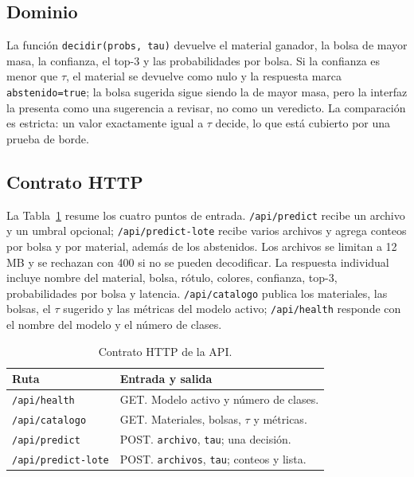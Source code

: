\documentclass[10pt]{ieeeconf}
\begin{document}
\subsection{Dominio}

La funci\'on \texttt{decidir(probs, tau)} devuelve el material ganador, la bolsa
de mayor masa, la confianza, el top-3 y las probabilidades por bolsa. Si la
confianza es menor que $\tau$, el material se devuelve como nulo y la respuesta
marca \texttt{abstenido=true}; la bolsa sugerida sigue siendo la de mayor masa,
pero la interfaz la presenta como una sugerencia a revisar, no como un veredicto.
La comparaci\'on es estricta: un valor exactamente igual a $\tau$ decide, lo que
est\'a cubierto por una prueba de borde.

\subsection{Contrato HTTP}

La Tabla~\ref{tab:api} resume los cuatro puntos de entrada. \texttt{/api/predict}
recibe un archivo y un umbral opcional; \texttt{/api/predict-lote} recibe varios
archivos y agrega conteos por bolsa y por material, adem\'as de los abstenidos.
Los archivos se limitan a 12 MB y se rechazan con 400 si no se pueden decodificar.
La respuesta individual incluye nombre del material, bolsa, r\'otulo, colores,
confianza, top-3, probabilidades por bolsa y latencia. \texttt{/api/catalogo}
publica los materiales, las bolsas, el $\tau$ sugerido y las m\'etricas del modelo
activo; \texttt{/api/health} responde con el nombre del modelo y el n\'umero de
clases.

\begin{table}[t]
\centering
\caption{Contrato HTTP de la API.}
\label{tab:api}
\scriptsize
\setlength{\tabcolsep}{3pt}
\begin{tabular}{@{}>{\raggedright\arraybackslash}p{}>{\raggedright\arraybackslash}p{}@{}}
\toprule
Ruta & Entrada y salida \\
\midrule
\texttt{/api/health} & GET. Modelo activo y n\'umero de clases. \\
\texttt{/api/catalogo} & GET. Materiales, bolsas, $\tau$ y m\'etricas. \\
\texttt{/api/predict} & POST. \texttt{archivo}, \texttt{tau}; una decisi\'on. \\
\texttt{/api/predict-lote} & POST. \texttt{archivos}, \texttt{tau}; conteos y lista. \\
\bottomrule
\end{tabular}
\end{table}
\end{document}
